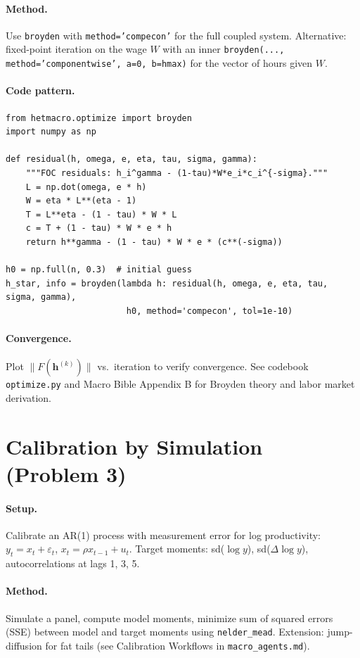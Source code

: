 \documentclass[12pt]{book}
\begin{document}
\begin{onehalfspacing}
\paragraph{Method.} Use \texttt{broyden} with \texttt{method='compecon'} for the full coupled system. Alternative: fixed-point iteration on the wage $W$ with an inner \texttt{broyden(..., method='componentwise', a=0, b=}\texttt{hmax)} for the vector of hours given $W$.

\paragraph{Code pattern.}

\begin{lstlisting}
from hetmacro.optimize import broyden
import numpy as np

def residual(h, omega, e, eta, tau, sigma, gamma):
    """FOC residuals: h_i^gamma - (1-tau)*W*e_i*c_i^{-sigma}."""
    L = np.dot(omega, e * h)
    W = eta * L**(eta - 1)
    T = L**eta - (1 - tau) * W * L
    c = T + (1 - tau) * W * e * h
    return h**gamma - (1 - tau) * W * e * (c**(-sigma))

h0 = np.full(n, 0.3)  # initial guess
h_star, info = broyden(lambda h: residual(h, omega, e, eta, tau, sigma, gamma),
                        h0, method='compecon', tol=1e-10)
\end{lstlisting}

\paragraph{Convergence.} Plot $\|F(\mathbf{h}^{(k)})\|$ vs.\ iteration to verify convergence. See codebook \texttt{optimize.py} and Macro Bible Appendix B for Broyden theory and labor market derivation.

\section{Calibration by Simulation (Problem 3)}

\paragraph{Setup.} Calibrate an AR(1) process with measurement error for log productivity: $y_t = x_t + \varepsilon_t$, $x_t = \rho x_{t-1} + u_t$. Target moments: sd($\log y$), sd($\Delta \log y$), autocorrelations at lags 1, 3, 5.

\paragraph{Method.} Simulate a panel, compute model moments, minimize sum of squared errors (SSE) between model and target moments using \texttt{nelder\_mead}. Extension: jump-diffusion for fat tails (see Calibration Workflows in \texttt{macro\_agents.md}).


\end{onehalfspacing}
\end{document}
